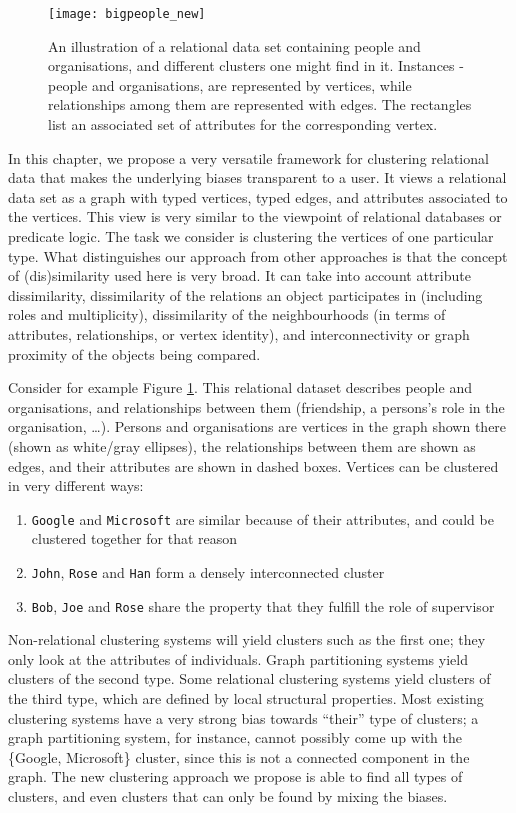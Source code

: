 \begin{figure}
  \centering
  \medskip
  \texttt{[image: bigpeople\_new]}
  \caption{An illustration of a relational data set containing people and organisations, and different clusters one might find in it. Instances - people and organisations, are represented by vertices, while relationships among them are represented with edges. The rectangles list an associated set of attributes for the corresponding vertex.}
  \label{fig:clustering:intro}
\end{figure}


In this chapter, we propose a very versatile framework for clustering relational data that makes the underlying biases transparent to a user.  
It views a relational data set as a graph with typed vertices, typed edges, and attributes associated to the vertices.  
This view is very similar to the viewpoint of relational databases or predicate logic.  
The task we consider is clustering the vertices of one particular type. 
What distinguishes our approach from other approaches is that the concept of (dis)similarity used here is very broad.  
It can take into account attribute dissimilarity, dissimilarity of the relations an object participates in (including roles and multiplicity), dissimilarity of the neighbourhoods (in terms of attributes, relationships, or vertex identity), and interconnectivity or graph proximity of the objects being compared. 


Consider for example Figure \ref{fig:clustering:intro}.
This relational dataset describes people and organisations, and relationships between them (friendship, a persons’s role in the organisation, \ldots).   
Persons and organisations are vertices in the graph shown there (shown as white/gray ellipses), the relationships between them are shown as edges, and their attributes are shown in dashed boxes.  
Vertices can be clustered in very different ways:
\begin{enumerate}
    \item {\tt Google} and {\tt Microsoft} are similar because of their attributes, and could be clustered together for that reason
    \item {\tt John}, {\tt Rose} and {\tt Han} form a densely interconnected cluster
    \item {\tt Bob}, {\tt Joe} and {\tt Rose} share the property that they fulfill the role of supervisor
\end{enumerate}
Non-relational clustering systems will yield clusters such as the first one; they only look at the attributes of individuals.  
Graph partitioning systems yield clusters of the second type.  
Some relational clustering systems yield clusters of the third type, which are defined by local structural properties.  
Most existing clustering systems have a very strong bias towards ``their'' type of clusters; a graph partitioning system, for instance, cannot possibly come up with the \{Google, Microsoft\} cluster, since this is not a connected component in the graph.  
The new clustering approach we propose is able to find all types of clusters, and even clusters that can only be found by mixing the biases.








